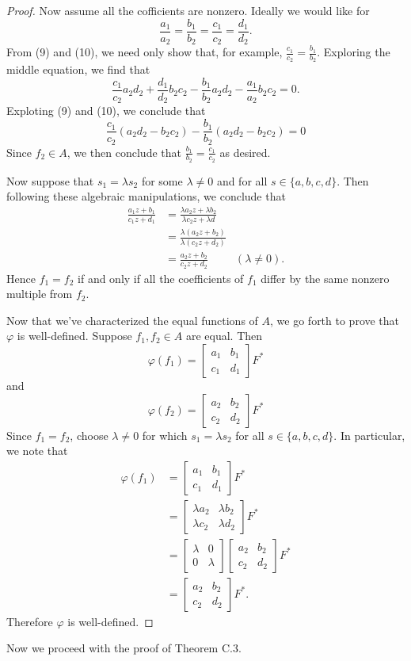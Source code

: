 \documentclass[12pt]{article}
\newcommand{\lftmat}[4]{\begin{bmatrix} {#1} & {#2} \\ {#3} & {#4} \end{bmatrix}}
\theoremstyle{plain}
\theoremstyle{definition}
\begin{document}
\begin{appendices}
\begin{proof}
	Now assume all the cofficients are nonzero. Ideally we would like for 
	\[
		\frac{a_1}{a_2} = \frac{b_1}{b_2} = \frac{c_1}{c_2} = \frac{d_1}{d_2}.
	\] 
	From (9) and (10), we need only show that, for example, $\frac{c_1}{c_2} = \frac{b_1}{b_2}$.	Exploring the middle equation, we find that
	\[
		\frac{c_1}{c_2}a_2d_2 + \frac{d_1}{d_2}b_2c_2 - \frac{b_1}{b_2}a_2d_2 - \frac{a_1}{a_2}b_2c_2 = 0.
	\]
	Exploting (9) and (10), we conclude that
	\[
		\frac{c_1}{c_2}(a_2d_2 - b_2c_2) - \frac{b_1}{b_2}(a_2d_2 - b_2c_2) = 0
	\]
	Since $f_2\in A$, we then conclude that $\frac{b_1}{b_2} = \frac{c_1}{c_2}$ as desired.
	
	Now suppose that $s_1 = \lambda s_2$ for some $\lambda\neq 0$ and for all $s\in\{a,b,c,d\}$. Then following these algebraic manipulations, we conclude that
	\begin{align*}
		\frac{a_1z + b_1}{c_1z + d_1} & = \frac{\lambda a_2z + \lambda b_2}{\lambda c_2z + \lambda d}\\
		& = \frac{\lambda(a_2z + b_2)}{\lambda(c_2z + d_2)}\\
		& = \frac{a_2z + b_2}{c_2z + d_2} & (\lambda \neq 0).
	\end{align*}
	Hence $f_1 = f_2$ if and only if all the coefficients of $f_1$ differ by the same nonzero multiple from $f_2$.
	
	Now that we've characterized the equal functions of $A$, we go forth to prove that $\varphi$ is well-defined. Suppose $f_1,f_2\in A$ are equal. Then
	\[
		\varphi(f_1) = \lftmat{a_1}{b_1}{c_1}{d_1} F^*
	\]
	and 
	\[
		\varphi(f_2) = \lftmat{a_2}{b_2}{c_2}{d_2} F^*
	\]
	Since $f_1 = f_2$, choose $\lambda\neq 0$ for which $s_1 = \lambda s_2$ for all $s\in\{a,b,c,d\}$. In particular, we note that
	\begin{align*}
		\varphi(f_1) & = \lftmat{a_1}{b_1}{c_1}{d_1} F^*\\
		& = \lftmat{\lambda a_2}{\lambda b_2}{\lambda c_2}{\lambda d_2} F^*\\
		& = \lftmat{\lambda}{0}{0}{\lambda}\lftmat{a_2}{b_2}{c_2}{d_2} F^*\\
		& = \lftmat{a_2}{b_2}{c_2}{d_2} F^*.
	\end{align*}
	Therefore $\varphi$ is well-defined.
\end{proof}
	
Now we proceed with the proof of Theorem C.3.	
	

\end{appendices}
\end{document}
